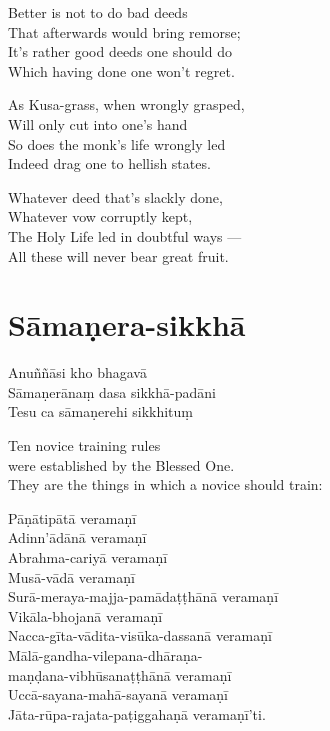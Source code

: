 \clearpage

\begin{english}
  Better is not to do bad deeds\\
  That afterwards would bring remorse;\\
  It's rather good deeds one should do\\
  Which having done one won't regret.

  As Kusa-grass, when wrongly grasped,\\
  Will only cut into one's hand\\
  So does the monk's life wrongly led\\
  Indeed drag one to hellish states.

  Whatever deed that's slackly done,\\
  Whatever vow corruptly kept,\\
  The Holy Life led in doubtful ways ---\\
  All these will never bear great fruit.
\end{english}


\section{Sāmaṇera-sikkhā}


Anuññāsi kho bhagavā\\
Sāmaṇerānaṃ dasa sikkhā-padāni\\
Tesu ca sāmaṇerehi sikkhituṃ\\

\begin{english}
  Ten novice training rules\\
  were established by the Blessed One.\\
  They are the things in which a novice should train:
\end{english}

\clearpage

Pāṇātipātā veramaṇī\\
Adinn'ādānā veramaṇī\\
Abrahma-cariyā veramaṇī\\
Musā-vādā veramaṇī\\
Surā-meraya-majja-pamādaṭṭhānā veramaṇī\\
Vikāla-bhojanā veramaṇī\\
Nacca-gīta-vādita-visūka-dassanā veramaṇī\\
Mālā-gandha-vilepana-dhāraṇa-\\
\vin maṇḍana-vibhūsanaṭṭhānā veramaṇī\\
Uccā-sayana-mahā-sayanā veramaṇī\\
Jāta-rūpa-rajata-paṭiggahaṇā veramaṇī'ti.

